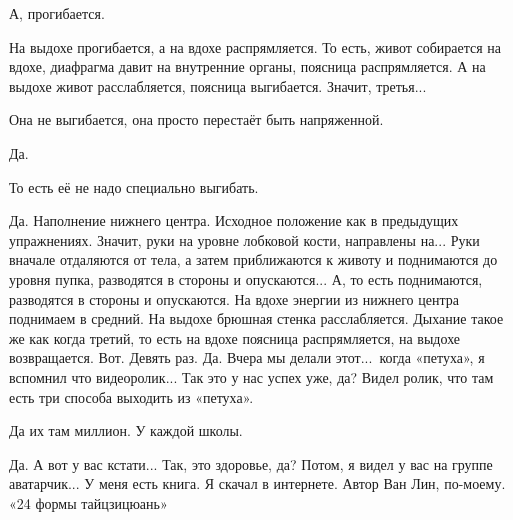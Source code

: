 \M
А, прогибается.

\I
На выдохе прогибается, а на вдохе распрямляется. То есть, живот собирается на вдохе,
диафрагма давит на внутренние органы, поясница распрямляется.
А на выдохе живот расслабляется, поясница выгибается. Значит, третья...

\M
Она не выгибается, она просто перестаёт быть напряженной.

\I
Да. 

\M
То есть её не надо
специально выгибать.

\I
Да. Наполнение нижнего центра. Исходное положение как в предыдущих упражнениях.
Значит, руки на уровне лобковой кости, направлены на... Руки вначале отдаляются от тела,
а затем приближаются к животу и поднимаются до уровня пупка, разводятся
в стороны и опускаются... А, то есть поднимаются, разводятся в стороны и опускаются.
На вдохе энергии из нижнего центра поднимаем в средний.
На выдохе брюшная стенка расслабляется. Дыхание такое
же как когда третий, то есть на вдохе поясница
распрямляется, на выдохе возвращается. Вот.
Девять раз. Да. Вчера мы делали этот...\ когда «петуха», я вспомнил что видеоролик...
Так это у нас успех уже, да? Видел ролик, что там
есть три способа выходить из «петуха».

\M
Да их там миллион. У каждой школы.

\I
Да. А вот у вас кстати... Так, это здоровье, да?
Потом, я видел у
вас на группе аватарчик...
У меня есть книга. Я скачал в интернете. Автор Ван Лин, по-моему.
«24 формы тайцзицюань»


